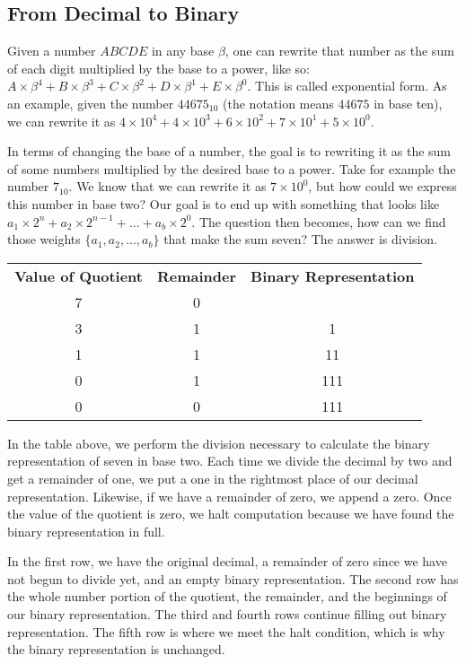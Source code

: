 \documentclass[12pt]{article}
\begin{document}
\subsection{From Decimal to Binary}
Given a number $ABCDE$ in any base $\beta$, one can rewrite that number as the sum of each digit multiplied by the base to a power, like so: $A\times\beta^4 + B\times\beta^3 + C\times\beta^2 + D\times\beta^1 + E\times\beta^0$. This is called exponential form. As an example, given the number $44675_{10}$ (the notation means $44675$ in base ten), we can rewrite it as $4\times10^4 + 4\times10^3 + 6\times10^2 + 7\times10^1 + 5\times10^0$.

\par In terms of changing the base of a number, the goal is to rewriting it as the sum of some numbers multiplied by the desired base to a power. Take for example the number $7_{10}$. We know that we can rewrite it as $7\times10^0$, but how could we express this number in base two? Our goal is to end up with something that looks like $a_1\times2^{n} + a_2\times2^{n-1} + ... + a_b\times2^0$. The question then becomes, how can we find those weights $\{a_1, a_2, ..., a_b\}$ that make the sum seven? The answer is division.

\begin{center}
\begin{tabular}{c|c|c}
  \textbf{Value of Quotient} & \textbf{Remainder} & \textbf{Binary Representation} \\
  7 & 0 & \\
  3 & 1 & 1 \\
  1 & 1 & 11 \\
  0 & 1 & 111 \\
  0 & 0 & 111
\end{tabular}
\end{center}

\par In the table above, we perform the division necessary to calculate the binary representation of seven in base two. Each time we divide the decimal by two and get a remainder of one, we put a one in the rightmost place of our decimal representation. Likewise, if we have a remainder of zero, we append a zero. Once the value of the quotient is zero, we halt computation because we have found the binary representation in full.

\par In the first row, we have the original decimal, a remainder of zero since we have not begun to divide yet, and an empty binary representation. The second row has the whole number portion of the quotient, the remainder, and the beginnings of our binary representation. The third and fourth rows continue filling out binary representation. The fifth row is where we meet the halt condition, which is why the binary representation is unchanged.
\end{document}
